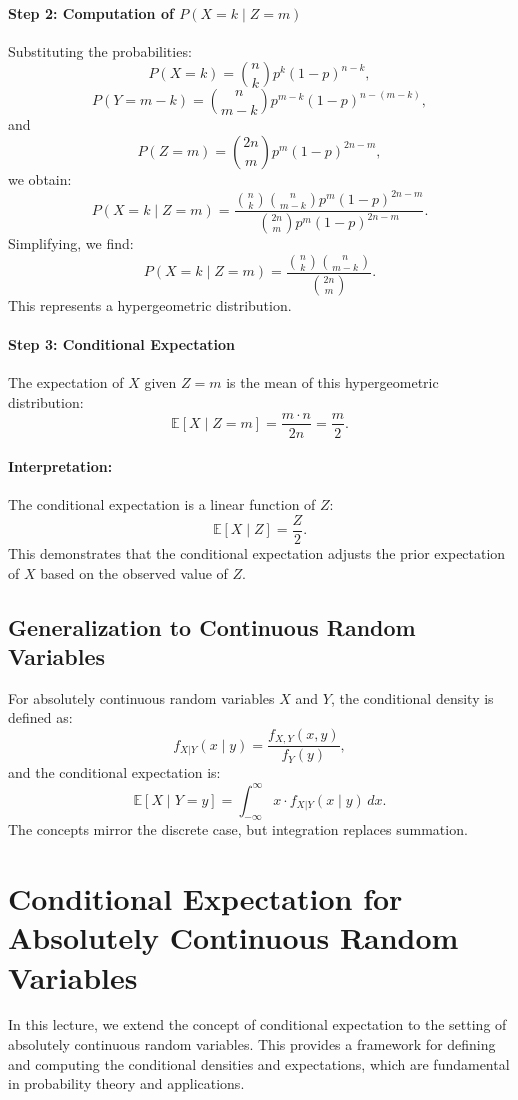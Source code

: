 \paragraph{Step 2: Computation of \(P(X = k \mid Z = m)\)}
Substituting the probabilities:
\[
P(X = k) = \binom{n}{k} p^k (1-p)^{n-k},
\]
\[
P(Y = m-k) = \binom{n}{m-k} p^{m-k} (1-p)^{n-(m-k)},
\]
and
\[
P(Z = m) = \binom{2n}{m} p^m (1-p)^{2n-m},
\]
we obtain:
\[
P(X = k \mid Z = m) = \frac{\binom{n}{k} \binom{n}{m-k} p^m (1-p)^{2n-m}}{\binom{2n}{m} p^m (1-p)^{2n-m}}.
\]
Simplifying, we find:
\[
P(X = k \mid Z = m) = \frac{\binom{n}{k} \binom{n}{m-k}}{\binom{2n}{m}}.
\]
This represents a hypergeometric distribution.

\paragraph{Step 3: Conditional Expectation}
The expectation of \(X\) given \(Z = m\) is the mean of this hypergeometric distribution:
\[
\mathbb{E}[X \mid Z = m] = \frac{m \cdot n}{2n} = \frac{m}{2}.
\]

\paragraph{Interpretation:}
The conditional expectation is a linear function of \(Z\):
\[
\mathbb{E}[X \mid Z] = \frac{Z}{2}.
\]
This demonstrates that the conditional expectation adjusts the prior expectation of \(X\) based on the observed value of \(Z\).

\subsection{Generalization to Continuous Random Variables}
For absolutely continuous random variables \(X\) and \(Y\), the conditional density is defined as:
\[
f_{X|Y}(x \mid y) = \frac{f_{X,Y}(x, y)}{f_Y(y)},
\]
and the conditional expectation is:
\[
\mathbb{E}[X \mid Y=y] = \int_{-\infty}^\infty x \cdot f_{X|Y}(x \mid y) \, dx.
\]
The concepts mirror the discrete case, but integration replaces summation.


\section{Conditional Expectation for Absolutely Continuous Random Variables}

In this lecture, we extend the concept of conditional expectation to the setting of absolutely continuous random variables. This provides a framework for defining and computing the conditional densities and expectations, which are fundamental in probability theory and applications.

